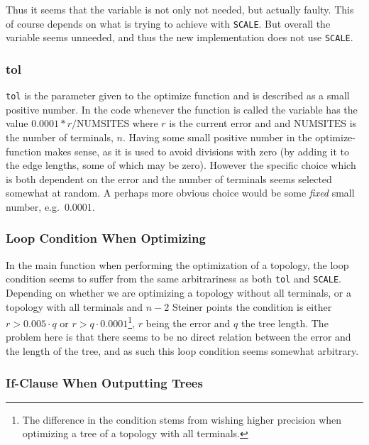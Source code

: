 Thus it seems that the variable is not only not needed, but actually faulty.
This of course depends on what \citeauthor{smith1992} is trying to achieve with \texttt{SCALE}.
But overall the variable seems unneeded, and thus the new implementation does
not use \texttt{SCALE}.

\subsubsection{tol}
\label{sec:tol}

\texttt{tol} is the parameter given to the optimize function and is described as
a small positive number. In the code whenever the function is called the
variable has the value $0.0001*r/\text{NUMSITES}$ where $r$ is the current error
and and $\text{NUMSITES}$ is the number of terminals, $n$. Having some small
positive number in the optimize-function makes sense, as it is used to avoid
divisions with zero (by adding it to the edge lengths, some of which may be
zero). However the specific choice which is both dependent on the error and the
number of terminals seems selected somewhat at random. A perhaps more obvious
choice would be some \textit{fixed} small number, e.g.\ $0.0001$.

\subsubsection{Loop Condition When Optimizing}
\label{sec:loop-condition-when-1}

In the main function when performing the optimization of a topology, the loop
condition seems to suffer from the same arbitrariness as both \texttt{tol} and
\texttt{SCALE}. Depending on whether we are optimizing a topology without all
terminals, or a topology with all terminals and $n-2$ Steiner points the
condition is either $r > 0.005 \cdot q$ or $r > q \cdot 0.0001$\footnote{The
  difference in the condition stems from wishing higher precision when
  optimizing a tree of a topology with all terminals.}, $r$ being the error and
$q$ the tree length. The problem here is that there seems to be no direct relation
between the error and the length of the tree, and as such this loop condition
seems somewhat arbitrary.

\subsubsection{If-Clause When Outputting Trees}
\label{sec:if-clause-when}

